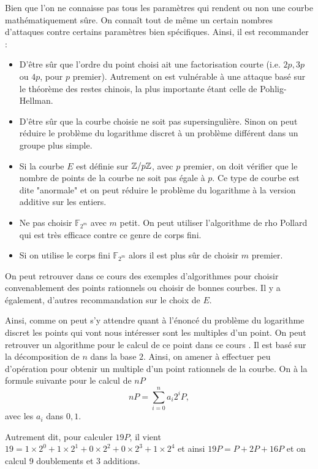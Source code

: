 Bien que l'on ne connaisse pas tous les paramètres qui rendent ou non une courbe
mathématiquement sûre. On connaît tout de même un certain nombres d'attaques contre certains
paramètres bien spécifiques.
Ainsi, il est recommander :
\begin{itemize}
    \item D'être sûr que l'ordre du point choisi ait une factorisation courte (i.e. $2p,3p$ ou
        $4p$, pour $p$ premier). Autrement on est vulnérable à une attaque basé sur le théorème
        des restes chinois, la plus importante étant celle de Pohlig-Hellman.
    \item D'être sûr que la courbe choisie ne soit pas supersingulière. Sinon on peut réduire
        le problème du logarithme discret à un problème différent dans un groupe plus simple.
    \item Si la courbe $E$ est définie sur $\mathbb{Z} / p \mathbb{Z}$, avec $p$ premier, on doit vérifier que
        le nombre de points de la courbe ne soit pas égale à $p$. Ce type de courbe est dite
        "anormale" et on peut réduire le problème du logarithme à la version additive sur les
        entiers.
    \item Ne pas choisir $\mathbb{F}_{2^{m}}$ avec $m$ petit. On peut utiliser l'algorithme de
        rho Pollard qui est très efficace contre ce genre de corps fini.
    \item Si on utilise le corps fini $\mathbb{F}_{2^{m}}$ alors il est plus sûr de choisir
        $m$ premier.
\end{itemize}

On peut retrouver dans ce cours \cite[p17-18]{Delaunay} des exemples d'algorithmes pour 
choisir convenablement des points rationnels ou choisir de bonnes courbes. Il y a également,
d'autres recommandation sur le choix de $E$.

Ainsi, comme on peut s'y attendre quant à l'énoncé du problème du logarithme discret les points
qui vont nous intéresser sont les multiples d'un point. On peut retrouver un algorithme pour le
calcul de ce point dans ce cours \cite[p10]{Delaunay}. Il est basé sur la décomposition de $n$
dans la base $2$. Ainsi, on amener à effectuer peu d'opération pour obtenir un multiple d'un
point rationnels de la courbe. On à la formule suivante pour le calcul de $nP$ 
\[
nP = \sum_{i= 0}^{n} a_{i}2^{i}P
,\] 
avec les $a_{i}$ dans ${0,1}$.

Autrement dit, pour calculer $19P$, il vient $19 = 1 \times 2^{0} + 1 \times 2^{1} + 0 \times
2^{2} + 0 \times 2^{3} + 1 \times 2^{4} $ et ainsi $19P = P + 2P + 16P$ et on calcul 9
doublements et 3 additions.

